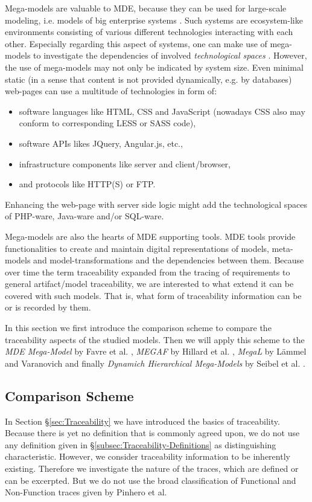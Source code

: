 \documentclass[runningheads,a4paper]{llncs}
\begin{document}
Mega-models are valuable to MDE, because they can be used for large-scale modeling, i.e. models of big enterprise systems \cite{TowardsAMegamodel}. 
Such systems are ecosystem-like environments consisting of various different technologies interacting with each other. 
Especially regarding this aspect of systems, one can make use of mega-models to investigate the dependencies of involved \textit{technological spaces} \cite{MEGAL1}\cite{MEGAL2}\cite{TowardsAMegamodel}. 
However, the use of mega-models may not only be indicated by system size. 
Even minimal static (in a sense that content is not provided dynamically, e.g. by databases) web-pages can use a multitude of technologies in form of:
\begin{itemize}
\item software languages like HTML, CSS and JavaScript (nowadays CSS also may conform to corresponding LESS or SASS code),
\item software APIs likes JQuery, Angular.js, etc.,
\item infrastructure components like server and client/browser, 
\item and protocols like HTTP(S) or FTP.
\end{itemize}
Enhancing the web-page with server side logic might add the technological spaces of PHP-ware, Java-ware and/or SQL-ware.

Mega-models are also the hearts of MDE supporting tools.
MDE tools provide functionalities to create and maintain digital representations of models, meta-models and model-transformations and the dependencies between them. 
Because over time the term traceability expanded from the tracing of requirements to general artifact/model traceability, we are interested to what extend it can be covered with such models.
That is, what form of traceability information can be or is recorded by them.

In this section we first introduce the comparison scheme to compare the traceability aspects of the studied models.
Then we will apply this scheme to 
	the \textit{MDE Mega-Model}  by Favre et al. \cite{TowardsAMegamodel},
	\textit{MEGAF} by Hillard et al. \cite{MEGAF},
	\textit{MegaL} by Lämmel and Varanovich \cite{MEGAL2}
	and finally \textit{Dynamich Hierarchical Mega-Models} by Seibel et al. \cite{DHMM}.



\subsection{Comparison Scheme}
In Section §\ref{sec:Traceability} we have introduced the basics of traceability.
Because there is yet no definition that is commonly agreed upon, we do not use any definition given in §\ref{subsec:Traceability-Definitions} as distinguishing characteristic.
However, we consider traceability information to be inherently existing.
Therefore we investigate the nature of the traces, which are defined or can be excerpted.
But we do not use the broad classification of Functional and Non-Function traces given by Pinhero et al.
\end{document}
